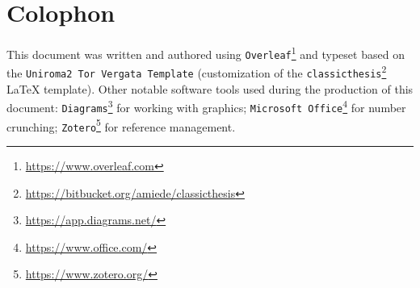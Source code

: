 \hfill
\vfill
\section*{Colophon}

This document was written and authored using \texttt{Overleaf}\footnote{\url{https://www.overleaf.com}} and typeset based on the \texttt{Uniroma2 Tor Vergata Template} (customization of the \texttt{classicthesis}\footnote{\url{https://bitbucket.org/amiede/classicthesis}} \LaTeX{} template). Other notable software tools used during the production of this document:
\texttt{Diagrams}\footnote{\url{https://app.diagrams.net/}} for working with graphics; \texttt{Microsoft Office}\footnote{\url{https://www.office.com/}} for number crunching; \texttt{Zotero}\footnote{\url{https://www.zotero.org/}} for reference management.\\

\bigskip
